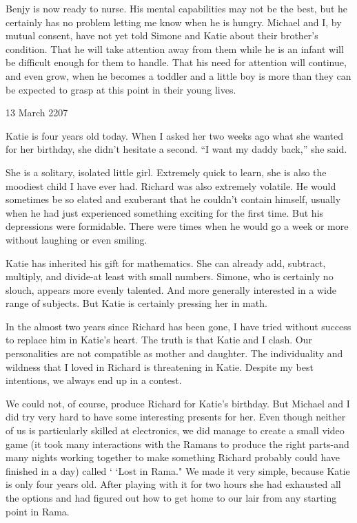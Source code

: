 \documentclass[]{article}
\begin{document}
Benjy is now ready to nurse.  His mental capabilities may not be the best, but he certainly has no problem letting me know when he is hungry.  Michael and I, by mutual consent, have not yet told Simone and Katie about their brother’s condition.  That he will take attention away from them while he is an infant will be difficult enough for them to handle.  That his need for attention will continue, and even grow, when he becomes a toddler and a little boy is more than they can be expected to grasp at this point in their young lives.

13 March 2207

Katie is four years old today.  When I asked her two weeks ago what she wanted for her birthday, she didn’t hesitate a second.  “I want my daddy back,” she said.

She is a solitary, isolated little girl.  Extremely quick to learn, she is also the moodiest child I have ever had.  Richard was also extremely volatile.  He would sometimes be so elated and exuberant that he couldn’t contain himself, usually when he had just experienced something exciting for the first time.  But his depressions were formidable.  There were times when he would go a week or more without laughing or even smiling.

Katie has inherited his gift for mathematics.  She can already add, subtract, multiply, and divide-at least with small numbers.  Simone, who is certainly no slouch, appears more evenly talented.  And more generally interested in a wide range of subjects.  But Katie is certainly pressing her in math.

In the almost two years since Richard has been gone, I have tried without success to replace him in Katie’s heart.  The truth is that Katie and I clash.  Our personalities are not compatible as mother and daughter.  The individuality and wildness that I loved in Richard is threatening in Katie.  Despite my best intentions, we always end up in a contest.

We could not, of course, produce Richard for Katie’s birthday.  But Michael and I did try very hard to have some interesting presents for her.  Even though neither of us is particularly skilled at electronics, we did manage to create a small video game (it took many interactions with the Ramans to produce the right parts-and many nights working together to make something Richard probably could have finished in a day) called ‘ ‘Lost in Rama."  We made it very simple, because Katie is only four years old.  After playing with it for two hours she had exhausted all the options and had figured out how to get home to our lair from any starting point in Rama.
\end{document}
